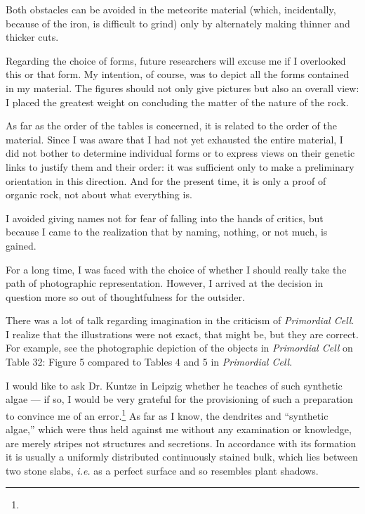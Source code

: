 \documentclass[a4paper, 12pt, oneside]{article}
\begin{document}
Both obstacles can be avoided in the meteorite material (which, incidentally, because of the iron, is difficult to grind) only by alternately making thinner and thicker cuts.

Regarding the choice of forms, future researchers will excuse me if I overlooked this or that form. My intention, of course, was to depict all the forms contained in my material. The figures should not only give pictures but also an overall view: I placed the greatest weight on concluding the matter of the nature of the rock.

As far as the order of the tables is concerned, it is related to the order of the material. Since I was aware that I had not yet exhausted the entire material, I did not bother to determine individual forms or to express views on their genetic links to justify them and their order: it was sufficient only to make a preliminary orientation in this direction. And for the present time, it is only a proof of organic rock, not about what everything is.

I avoided giving names not for fear of falling into the hands of critics, but because I came to the realization that by naming, nothing, or not much, is gained.

For a long time, I was faced with the choice of whether I should really take the path of photographic representation. However, I arrived at the decision in question more so out of thoughtfulness for the outsider.

There was a lot of talk regarding imagination in the criticism of \emph{Primordial Cell}. I realize that the illustrations were not exact, that might be, but they are correct. For example, see the photographic depiction of the objects in \emph{Primordial Cell} on Table 32: Figure 5 compared to Tables 4 and 5 in \emph{Primordial Cell}.

I would like to ask Dr. Kuntze in Leipzig whether he teaches of such synthetic algae --- if so, I would be very grateful for the provisioning of such a preparation to convince me of an error.\footnote{} As far as I know, the dendrites and ``synthetic algae,'' which were thus held against me without any examination or knowledge, are merely stripes not structures and secretions. In accordance with its formation it is usually a uniformly distributed continuously stained bulk, which lies between two stone slabs, \emph{i.e.} as a perfect surface and so resembles plant shadows.
\end{document}
